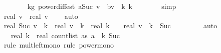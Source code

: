\begin{isabellebody}
\ \ \ \ \ \ \isamarkupfalse%
\ k{\isacharunderscore}{\kern0pt}g{\isacharunderscore}{\kern0pt}{}\ power{\isacharunderscore}{\kern0pt}diff{\isacharunderscore}{\kern0pt}est{\isacharbrackleft}{\kern0pt}\ a{\isacharequal}{\kern0pt}{\isachardoublequoteopen}Suc\ v{\isachardoublequoteclose}\ \ b{\isacharequal}{\kern0pt}{\isachardoublequoteopen}v{\isachardoublequoteclose}\ \ k\ {\isacharequal}{\kern0pt}{\isachardoublequoteopen}k{\isachardoublequoteclose}{\isacharbrackright}{\kern0pt}\isanewline
\ \ \ \ \ \ \isamarkupfalse%
\ simp\isanewline
\ \ \ \ \isamarkupfalse%
\ \isamarkupfalse%
\ {\isachardoublequoteopen}{\isacharparenleft}{\kern0pt}real\ {\isacharparenleft}{\kern0pt}v{\isacharplus}{\kern0pt}{}{\isacharparenright}{\kern0pt}\ {\isacharminus}{\kern0pt}\ real\ v{\isacharparenright}{\kern0pt}\ {\isacharequal}{\kern0pt}\ {}{\isachardoublequoteclose}\ \isamarkupfalse%
\ auto\isanewline
\ \ \ \ \isamarkupfalse%
\ \isamarkupfalse%
\ {\isachardoublequoteopen}real\ {\isacharparenleft}{\kern0pt}Suc\ v\ {\isacharcircum}{\kern0pt}\ k{\isacharparenright}{\kern0pt}\ {\isacharminus}{\kern0pt}\ real\ {\isacharparenleft}{\kern0pt}v\ {\isacharcircum}{\kern0pt}\ k{\isacharparenright}{\kern0pt}\ {\isasymle}\ real\ k\ {\isacharasterisk}{\kern0pt}\ {\isacharparenleft}{\kern0pt}{}\ {\isacharplus}{\kern0pt}\ real\ v{\isacharparenright}{\kern0pt}\ {\isacharcircum}{\kern0pt}\ {\isacharparenleft}{\kern0pt}k\ {\isacharminus}{\kern0pt}\ Suc\ {}{\isacharparenright}{\kern0pt}{\isachardoublequoteclose}\isanewline
\ \ \ \ \ \ \isamarkupfalse%
\ auto\isanewline
\ \ \ \ \isamarkupfalse%
\ \isamarkupfalse%
\ {\isachardoublequoteopen}{\isachardot}{\kern0pt}{\isachardot}{\kern0pt}{\isachardot}{\kern0pt}\ {\isasymle}\ real\ k\ {\isacharasterisk}{\kern0pt}\ real\ {\isacharparenleft}{\kern0pt}count{\isacharunderscore}{\kern0pt}list\ as\ a{\isacharparenright}{\kern0pt}\ {\isacharcircum}{\kern0pt}\ {\isacharparenleft}{\kern0pt}k{\isacharminus}{\kern0pt}\ Suc\ {}{\isacharparenright}{\kern0pt}{\isachardoublequoteclose}\isanewline
\ \ \ \ \ \ \isamarkupfalse%
\ {\isacharparenleft}{\kern0pt}rule\ mult{\isacharunderscore}{\kern0pt}left{\isacharunderscore}{\kern0pt}mono{\isacharcomma}{\kern0pt}\ rule\ power{\isacharunderscore}{\kern0pt}mono{\isacharparenright}{\kern0pt}\isanewline
\ \ \ \ \ \ \isamarkupfalse%

\end{isabellebody}
